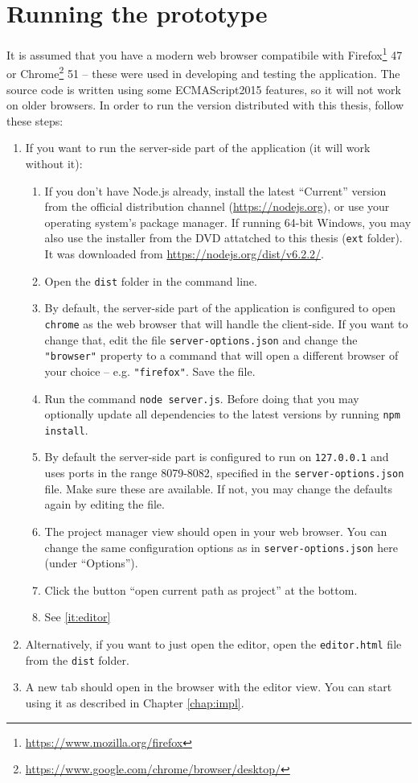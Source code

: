 \section{Running the prototype}
It is assumed that you have a modern web browser compatibile with Firefox\footnote{\url{
https://www.mozilla.org/firefox}} 47 or Chrome\footnote{\url{https://www.google.com/chrome/browser/desktop/}} 51 -- these were used in developing and testing the application. The source code is written using some ECMAScript2015 features, so it will not work on older browsers. In order to run the version distributed with this thesis, follow these steps:
\begin{enumerate}
    \item If you want to run the server-side part of the application (it will work without it):
    \begin{enumerate}
        \item If you don't have Node.js already, install the latest ``Current'' version from the official distribution channel (\url{https://nodejs.org}), or use your operating system's package manager. If running 64-bit Windows, you may also use the installer from the DVD attatched to this thesis (\texttt{ext} folder). It was downloaded from \url{https://nodejs.org/dist/v6.2.2/}.
        \item Open the \texttt{dist} folder in the command line.
        \item By default, the server-side part of the application is configured to open \texttt{chrome} as the web browser that will handle the client-side. If you want to change that, edit the file \texttt{server-options.json} and change the \texttt{"browser"} property to a command that will open a different browser of your choice -- e.g. \texttt{"firefox"}. Save the file.
        \item Run the command \texttt{node server.js}. Before doing that you may optionally update all dependencies to the latest versions by running \texttt{npm install}.
        \item By default the server-side part is configured to run on \texttt{127.0.0.1} and uses ports in the range 8079-8082, specified in the \texttt{server-options.json} file. Make sure these are available. If not, you may change the defaults again by editing the file.
        \item The project manager view should open in your web browser. You can change the same configuration options as in \texttt{server-options.json} here (under ``Options'').
        \item Click the button ``open current path as project'' at the bottom.
        \item See \ref{it:editor}
    \end{enumerate}
    \item Alternatively, if you want to just open the editor, open the \texttt{editor.html} file from the \texttt{dist} folder.
    \item\label{it:editor} A new tab should open in the browser with the editor view. You can start using it as described in Chapter \ref{chap:impl}.
\end{enumerate}

